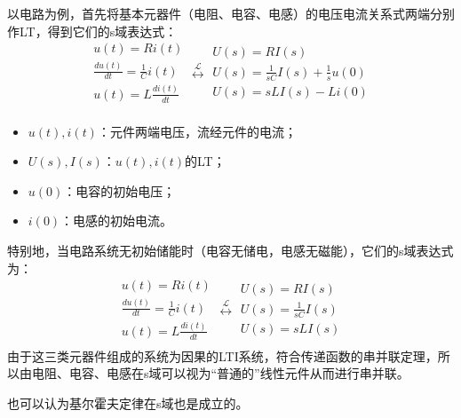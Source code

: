 以电路为例，首先将基本元器件（电阻、电容、电感）的电压电流关系式两端分别作LT，得到它们的s域表达式：
\[
\begin{array}{l}
	u\left( t \right) =Ri\left( t \right)\\
	\frac{du\left( t \right)}{dt}=\frac{1}{C}i\left( t \right)\\
	u\left( t \right) =L\frac{di\left( t \right)}{dt}\\
\end{array}\overset{\mathscr{L}}{\longleftrightarrow}\begin{array}{l}
	U\left( s \right) =RI\left( s \right)\\
	U\left( s \right) =\frac{1}{sC}I\left( s \right) +\frac{1}{s}u\left( 0 \right)\\
	U\left( s \right) =sLI\left( s \right) -Li\left( 0 \right)\\
\end{array}
\]
\begin{itemize}
    \item $u\left( t \right) ,i\left( t \right) $：元件两端电压，流经元件的电流；
    \item $U\left( s \right) ,I\left( s \right) $：$u\left( t \right) ,i\left( t \right) $的LT；
    \item $u\left( 0 \right) $：电容的初始电压；
    \item $i\left( 0 \right) $：电感的初始电流。
\end{itemize}
特别地，当电路系统无初始储能时（电容无储电，电感无磁能），它们的s域表达式为：
\[
\begin{array}{l}
	u\left( t \right) =Ri\left( t \right)\\
	\frac{du\left( t \right)}{dt}=\frac{1}{C}i\left( t \right)\\
	u\left( t \right) =L\frac{di\left( t \right)}{dt}\\
\end{array}\overset{\mathscr{L}}{\longleftrightarrow}\begin{array}{l}
	U\left( s \right) =RI\left( s \right)\\
	U\left( s \right) =\frac{1}{sC}I\left( s \right)\\
	U\left( s \right) =sLI\left( s \right)\\
\end{array}
\]
由于这三类元器件组成的系统为因果的LTI系统，符合传递函数的串并联定理，所以由电阻、电容、电感在s域可以视为“普通的”线性元件从而进行串并联。

也可以认为基尔霍夫定律在s域也是成立的。


